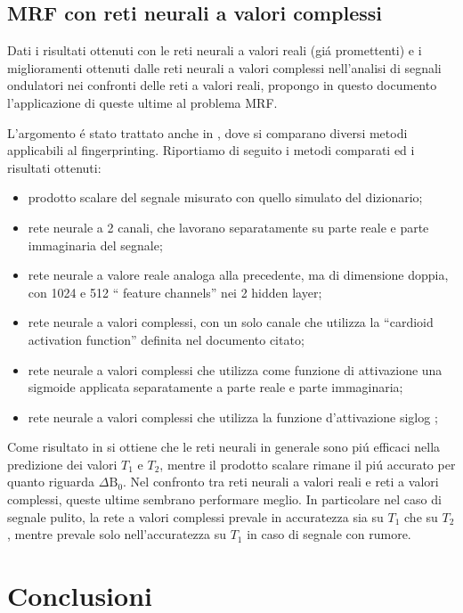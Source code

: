 \documentclass[a4paper,12pt]{report}
\begin{document}
 
 
 \section{MRF con reti neurali a valori complessi}
 
 Dati i risultati ottenuti con le reti neurali a valori reali (gi\'a promettenti) e i miglioramenti ottenuti dalle reti neurali a valori complessi nell'analisi di segnali ondulatori nei confronti delle reti a valori reali, propongo in questo documento l'applicazione di queste ultime al problema MRF.
 
 L'argomento \'e stato trattato anche in \cite{virtue2017better}, dove si comparano diversi metodi applicabili al fingerprinting. 
 Riportiamo di seguito i metodi comparati ed i risultati ottenuti:
 \begin{itemize}
  \item prodotto scalare del segnale misurato con quello simulato del dizionario;
  \item rete neurale a 2 canali, che lavorano separatamente su parte reale e parte immaginaria del segnale;
  \item rete neurale a valore reale analoga alla precedente, ma di dimensione doppia, con 1024 e 512 `` feature channels'' nei 2 hidden layer;
  \item rete neurale a valori complessi, con un solo canale che utilizza la ``cardioid activation function'' definita nel documento citato;
  \item rete neurale a valori complessi che utilizza come funzione di attivazione una sigmoide applicata separatamente a parte reale e parte immaginaria;
  \item rete neurale a valori complessi che utilizza la funzione d'attivazione siglog \cite{georgiou1992complex};
 \end{itemize}

 Come risultato in \cite{virtue2017better} si ottiene che le reti neurali in generale sono pi\'u efficaci nella predizione dei valori $T_1$ e $T_2$, mentre il prodotto scalare rimane il pi\'u accurato per quanto riguarda $\Delta\mbox{B}_0$. 
 Nel confronto tra reti neurali a valori reali e reti a valori complessi, queste ultime sembrano performare meglio. 
 In particolare nel caso di segnale pulito, la rete a valori complessi prevale in accuratezza sia su $T_1$ che su $T_2$, mentre prevale solo nell'accuratezza su $T_1$ in caso di segnale con rumore.

 
 \chapter{Conclusioni}
 
\end{document}
